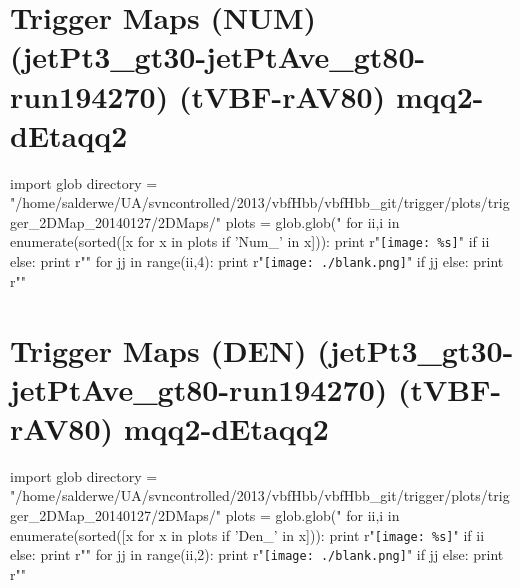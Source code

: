 \documentclass[12pt,english,dvipsnames]{beamer}
\newcommand{\UAoverlay}[0]{%
\begin{tikzpicture}[remember picture,overlay,shift={(current page.north east)}]
\node (zero) at (-1.8cm,-0.93cm) {\texttt{[image: ../logos/CMS.pdf]}\hspace{0.15cm}\texttt{[image: ../logos/CERN.pdf]}\hspace{0.15cm}\texttt{[image: ../logos/UA.pdf]}}; 
\end{tikzpicture}
}
\begin{document}
\section{Trigger Maps (NUM) (jetPt3\_gt30-jetPtAve\_gt80-run194270) (tVBF-rAV80) mqq2-dEtaqq2}
\begin{frame}[t,fragile]%
\begin{python}
import glob
directory = "/home/salderwe/UA/svncontrolled/2013/vbfHbb/vbfHbb_git/trigger/plots/trigger_2DMap_20140127/2DMaps/"
plots = glob.glob("%
for ii,i in enumerate(sorted([x for x in plots if 'Num_' in x])):
  print r"\texttt{[image: \%s]}"%
  if ii%
  else: print r"\hfill"
for jj in range(ii,4):
  print r"\texttt{[image: ./blank.png]}"
  if jj%
  else: print r"\hfill"
\end{python} 
\end{frame}
\section{Trigger Maps (DEN) (jetPt3\_gt30-jetPtAve\_gt80-run194270) (tVBF-rAV80) mqq2-dEtaqq2}
\begin{frame}[t,fragile]%
\begin{python}
import glob
directory = "/home/salderwe/UA/svncontrolled/2013/vbfHbb/vbfHbb_git/trigger/plots/trigger_2DMap_20140127/2DMaps/"
plots = glob.glob("%
for ii,i in enumerate(sorted([x for x in plots if 'Den_' in x])):
  print r"\texttt{[image: \%s]}"%
  if ii%
  else: print r"\hfill"
for jj in range(ii,2):
  print r"\texttt{[image: ./blank.png]}"
  if jj%
  else: print r"\hfill"
\end{python} 
\end{frame}
\end{document}
